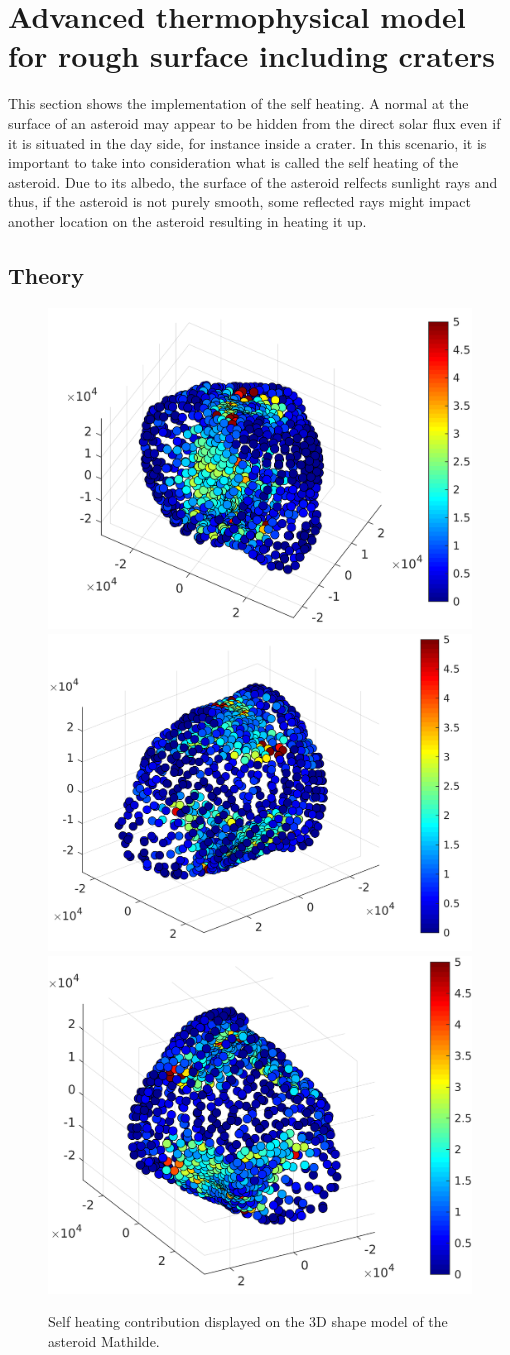 \section{Advanced thermophysical model for rough surface including craters}
\label{sec:5}

This section shows the implementation of the self heating. A normal at the surface of an asteroid may appear to be hidden from the direct solar flux even if it is situated in the day side, for instance inside a crater. In this scenario, it is important to take into consideration what is called the self heating of the asteroid. Due to its albedo, the surface of the asteroid relfects sunlight rays and thus, if the asteroid is not purely smooth, some reflected rays might impact another location on the asteroid resulting in heating it up.

\subsection{Theory}

\begin{figure}[b]
    \centering
    \includegraphics[width=0.33\linewidth]{rsc/self_3D_1.png}
    \includegraphics[width=0.33\linewidth]{rsc/self_3D_2.png}
    \includegraphics[width=0.33\linewidth]{rsc/self_3D_3.png}
    \caption{Self heating contribution displayed on the 3D shape model of the asteroid Mathilde.}
    \label{fig:5.5}
\end{figure}

